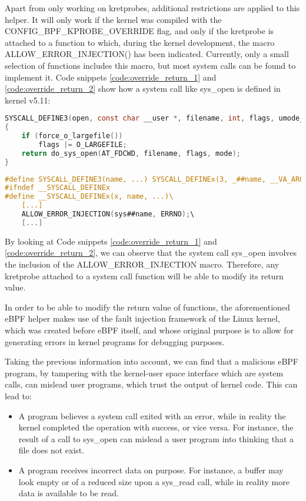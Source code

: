 Apart from only working on kretprobes, additional restrictions are applied to this helper. It will only work if the kernel was compiled with the CONFIG\_BPF\_KPROBE\_OVERRIDE flag, and only if the kretprobe is attached to a function to which, during the kernel development, the macro ALLOW\_ERROR\_INJECTION() has been indicated. Currently, only a small selection of functions includes this macro, but most system calls can be found to implement it. Code snippets \ref{code:override_return_1} and \ref{code:override_return_2} show how a system call like sys\_open is defined in kernel v5.11:

\begin{lstlisting}[language=C, caption={Definition of the syscall sys\_open in the kernel \cite{code_kernel_open}}, label={code:override_return_1}]
SYSCALL_DEFINE3(open, const char __user *, filename, int, flags, umode_t, mode)
{
	if (force_o_largefile())
		flags |= O_LARGEFILE;
	return do_sys_open(AT_FDCWD, filename, flags, mode);
}
\end{lstlisting}

\begin{lstlisting}[language=C, caption={Definition of the macro for creating syscalls, containing the error injection macro. Only relevant instructions included, complete macro can be found in the kernel \cite{code_kernel_syscall}}, label={code:override_return_2}]
#define SYSCALL_DEFINE3(name, ...) SYSCALL_DEFINEx(3, _##name, __VA_ARGS__)
#ifndef __SYSCALL_DEFINEx
#define __SYSCALL_DEFINEx(x, name, ...)\
	[...]
	ALLOW_ERROR_INJECTION(sys##name, ERRNO);\
	[...]
\end{lstlisting}


By looking at Code snippets \ref{code:override_return_1} and \ref{code:override_return_2}, we can observe that the system call sys\_open involves the inclusion of the ALLOW\_ERROR\_INJECTION macro. Therefore, any kretprobe attached to a system call function will be able to modify its return value.

In order to be able to modify the return value of functions, the aforementioned eBPF helper makes use of the fault injection framework of the Linux kernel\cite{fault_injection}, which was created before eBPF itself, and whose original purpose is to allow for generating errors in kernel programs for debugging purposes.

Taking the previous information into account, we can find that a malicious eBPF program, by tampering with the kernel-user space interface which are system calls, can mislead user programs, which trust the output of kernel code. This can lead to:
\begin{itemize}
\item A program believes a system call exited with an error, while in reality the kernel completed the operation with success, or vice versa. For instance, the result of a call to sys\_open can mislead a user program into thinking that a file does not exist.
\item A program receives incorrect data on purpose. For instance, a buffer may look empty or of a reduced size upon a sys\_read call, while in reality more data is available to be read.
\end{itemize}

